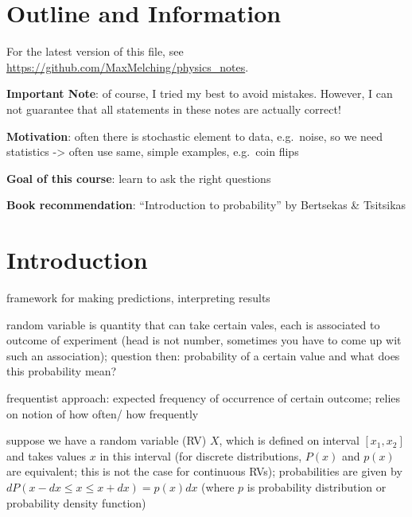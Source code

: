 \section*{Outline and Information}

\begin{center}
For the latest version of this file, see \url{https://github.com/MaxMelching/physics_notes}.

\textbf{Important Note}: of course, I tried my best to avoid mistakes. However, I can not guarantee that all statements in these notes are actually correct!


\textbf{Motivation}: often there is stochastic element to data, e.g.~noise, so we need statistics -> often use same, simple examples, e.g.~coin flips


\textbf{Goal of this course}: learn to ask the right questions

\textbf{Book recommendation}: \enquote{Introduction to probability} by Bertsekas \& Tsitsikas
\end{center}



\newpage



{
\hypersetup{linkcolor=black}
\tableofcontents
}



\newpage


\pagestyle{scrheadings}



\iffalse
\section{Introduction}

framework for making predictions, interpreting results


random variable is quantity that can take certain vales, each is associated to outcome of experiment (head is not number, sometimes you have to come up wit such an association); question then: probability of a certain value and what does this probability mean?

frequentist approach: expected frequency of occurrence of certain outcome; relies on notion of how often/ how frequently


suppose we have a random variable (RV) $X$, which is defined on interval $[x_1, x_2]$ and takes values $x$ in this interval (for discrete distributions, $P(x)$ and $p(x)$ are equivalent; this is not the case for continuous RVs); probabilities are given by $dP(x - dx \leq x \leq x + dx) = p(x) dx$ (where $p$ is probability distribution or probability density function)

